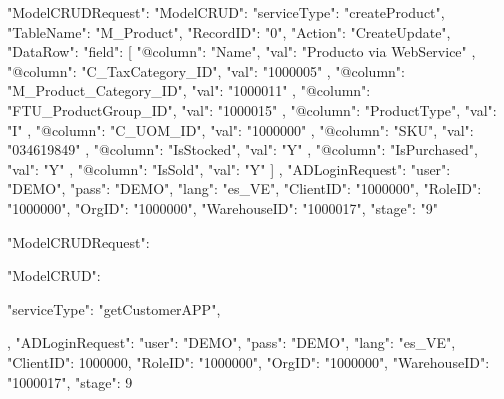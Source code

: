 {
    "ModelCRUDRequest": {
        "ModelCRUD": {
            "serviceType": "createProduct",
            "TableName": "M_Product",
            "RecordID": "0",
            "Action": "CreateUpdate",
            "DataRow": {
                "field": [
                    {
                        "@column": "Name",
                        "val": "Producto via WebService"
                    },
                    {
                        "@column": "C_TaxCategory_ID",
                        "val": "1000005"
                    },
                    {
                        "@column": "M_Product_Category_ID",
                        "val": "1000011"
                    },
                    {
                        "@column": "FTU_ProductGroup_ID",
                        "val": "1000015"
                    },
                    {
                        "@column": "ProductType",
                        "val": "I"
                    },
                    {
                        "@column": "C_UOM_ID",
                        "val": "1000000"
                    },
                    {
                        "@column": "SKU",
                        "val": "034619849"
                    },
                    {
                        "@column": "IsStocked",
                        "val": "Y"
                    },
                    {
                        "@column": "IsPurchased",
                        "val": "Y"
                    },
                    {
                        "@column": "IsSold",
                        "val": "Y"
                    }
                ]
            }
        },
        "ADLoginRequest": {
            "user": "DEMO",
            "pass": "DEMO",
            "lang": "es_VE",
            "ClientID": "1000000",
            "RoleID": "1000000",
            "OrgID": "1000000",
            "WarehouseID": "1000017",
            "stage": "9"
        }
    }
}




{
    "ModelCRUDRequest": {
        "ModelCRUD": {
            "serviceType": "getCustomerAPP",
           
        },
        "ADLoginRequest": {
            "user": "DEMO",
            "pass": "DEMO",
            "lang": "es_VE",
            "ClientID": 1000000,
            "RoleID": "1000000",
            "OrgID": "1000000",
            "WarehouseID": "1000017",
            "stage": 9
        }
    }
}
